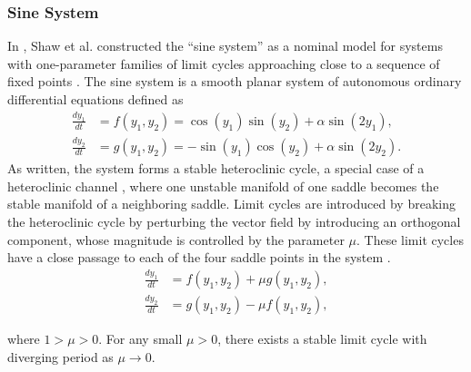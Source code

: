 \documentclass[12pt]{article}
\begin{document}
\subsubsection{Sine System}\label{app:sine}
In \cite{ShawParkChielThomas2012SIADS}, Shaw et al. constructed the ``sine system'' as  a nominal model for systems with one-parameter families of limit cycles approaching close to a sequence of fixed points \cite{ShawParkChielThomas2012SIADS}. The sine system is a smooth planar system of autonomous ordinary differential equations defined as
\begin{equation}
 \begin{split}
  \frac{dy_1}{dt} &=f(y_1,y_2) = \cos(y_1)\sin(y_2) + \alpha \sin(2y_1),\\
  \frac{dy_2}{dt} &=g(y_1,y_2) = -\sin(y_1)\cos(y_2) + \alpha \sin(2y_2).
 \end{split}
\end{equation}
As written, the system forms a stable heteroclinic cycle, a special case of a heteroclinic channel \cite{AfraimovichTristanHuertaRabinovich:2008:Chaos}, where one unstable manifold of one saddle becomes the stable manifold of a neighboring saddle.  Limit cycles are introduced by breaking the heteroclinic cycle by perturbing the vector field by introducing an orthogonal component, whose magnitude is controlled by the parameter $\mu$.  These limit cycles have a close passage to each of the four saddle points in the system \cite{Reyn1980-bookchapter}.
\begin{equation}
 \begin{split}
  \frac{dy_1}{dt} &= f(y_1,y_2) + \mu g(y_1,y_2),\\
  \frac{dy_2}{dt} &= g(y_1,y_2) - \mu f(y_1,y_2),
 \end{split}
\end{equation}

where $1 > \mu > 0$. For any small $\mu >0$, there exists a stable limit cycle with diverging period as $\mu \rightarrow 0$.
\end{document}
